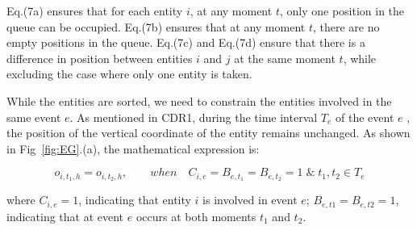 \documentclass[review,journal]{vgtc}         %
\begin{document}
\noindent Eq.(7a) ensures that for each entity $i$, at any moment $t$, only one position in the queue can be occupied. Eq.(7b) ensures that at any moment $t$, there are no empty positions in the queue. Eq.(7c) and Eq.(7d) ensure that there is a difference in position between entities $i$ and $j$ at the same moment $t$, while excluding the case where only one entity is taken.

While the entities are sorted, we need to constrain the entities involved in the same event $e$. As mentioned in CDR1, during the time interval $T_e$ of the event $e$ , the position of the vertical coordinate of the entity remains unchanged. As shown in Fig~\ref{fig:EG}.(a), the mathematical expression is: 

\vspace{-1em}
\begin{equation}
o_{i,t_1,h}=o_{i,t_2,h}, \quad\quad when \quad C_{i,e}=B_{e,t_1}=B_{e,t_2}=1 \;\&\; t_1,t_2 \in T_e
\end{equation}

\noindent where $C_{i,e}=1$, indicating that entity $i$ is involved in event $e$; $B_{e,t1}=B_{e,t2}=1$, indicating that at event $e$ occurs at both moments $t_1$ and $t_2$.
\end{document}
